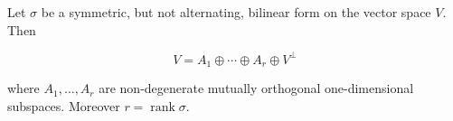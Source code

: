 Let $\sigma$ be a symmetric, but not alternating, bilinear form on the vector space $V$. Then

$$V = A_1 \oplus \cdots \oplus A_r \oplus V^\perp$$

where $A_1, \ldots, A_r$ are non-degenerate mutually orthogonal one-dimensional subspaces. Moreover $r = \operatorname{rank} \sigma$.
